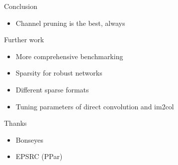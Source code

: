 \documentclass[xcolor=dvipsnames]{beamer}
\begin{document}
\begin{frame}{Conclusion}
    
    \begin{itemize}
        \item Channel pruning is the best, always
    \end{itemize}
    
\end{frame}


\begin{frame}{Further work}
\begin{itemize}
    \item More comprehensive benchmarking 
    \item Sparsity for robust networks
    \item Different sparse formats 
    \item Tuning parameters of direct convolution and im2col
\end{itemize}
\end{frame}

\begin{frame}{Thanks}
    \begin{itemize}
        \item Bonseyes
        \item EPSRC (PPar)
    \end{itemize}
\end{frame}
\end{document}
